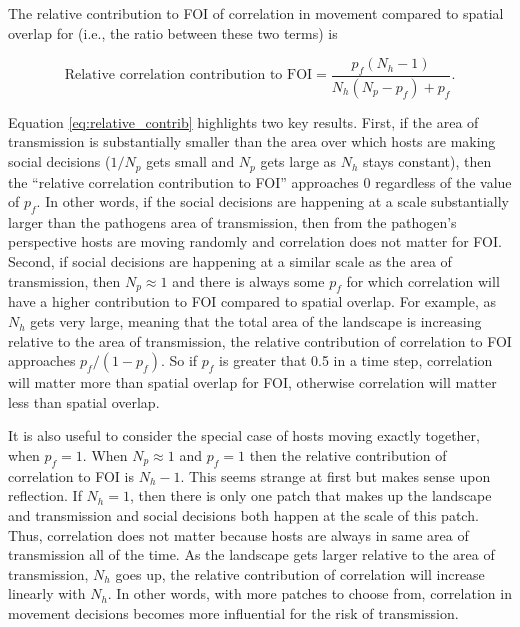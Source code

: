 \documentclass[letterpaper]{article}
\begin{document}
The relative contribution to FOI of correlation in movement compared to spatial overlap for (i.e., the ratio between these two terms) is

\begin{equation}
    \text{Relative correlation contribution to FOI} = \frac{p_f(N_h - 1)}{N_h(N_p - p_f) + p_f}.
    \label{eq:relative_contrib}
\end{equation}

Equation \ref{eq:relative_contrib} highlights two key results.  First, if the area of transmission is substantially smaller than the area over which hosts are making social decisions ($1 / N_p$ gets small and $N_p$ gets large as $N_h$ stays constant), then the ``relative correlation contribution to FOI'' approaches 0 regardless of the value of $p_f$. In other words, if the social decisions are happening at a scale substantially larger than the pathogens area of transmission, then from the pathogen's perspective hosts are moving randomly and correlation does not matter for FOI.
Second, if social decisions are happening at a similar scale as the area of transmission, then $N_p \approx 1$ and there is always some $p_f$ for which correlation will have a higher contribution to FOI compared to spatial overlap.  For example, as $N_h$ gets very large, meaning that the total area of the landscape is increasing relative to the area of transmission, the relative contribution of correlation to FOI approaches $p_f / (1 - p_f)$. So if $p_f$ is greater that 0.5 in a time step, correlation will matter more than spatial overlap for FOI, otherwise correlation will matter less than spatial overlap.  

It is also useful to consider the special case of hosts moving exactly together, when $p_f = 1$.  When $N_p \approx 1$ and $p_f = 1$ then the relative contribution of correlation to FOI is $N_h - 1$.  This seems strange at first but makes sense upon reflection.  If $N_h = 1$, then there is only one patch that makes up the landscape and transmission and social decisions both happen at the scale of this patch. Thus, correlation does not matter because hosts are always in same area of transmission all of the time.  As the landscape gets larger relative to the area of transmission, $N_h$ goes up,  the relative contribution of correlation will increase linearly with $N_h$.  In other words, with more patches to choose from, correlation in movement decisions becomes more influential for the risk of transmission. 

\end{document}
